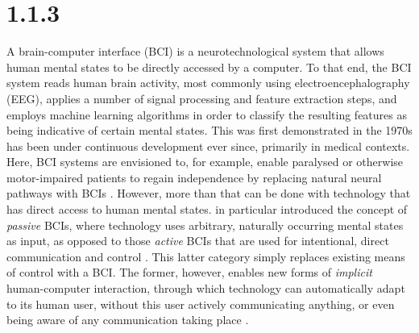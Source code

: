 \documentclass[a4paper]{article}
\begin{document}
\title{}
\date{}

\author[1,*]{Laurens R. Krol}
\author[2]{Thorsten O. Zander}


\maketitle

\begin{abstract}

\end{abstract}


\section*{1.1.3}

A brain-computer interface (BCI) is a neurotechnological system that allows human mental states to be directly accessed by a computer. To that end, the BCI system reads human brain activity, most commonly using electroencephalography (EEG), applies a number of signal processing and feature extraction steps, and employs machine learning algorithms in order to classify the resulting features as being indicative of certain mental states. This was first demonstrated in the 1970s \cite{vidal1977realtimedetect} has been under continuous development ever since, primarily in medical contexts. Here, BCI systems are envisioned to, for example, enable paralysed or otherwise motor-impaired patients to regain independence by replacing natural neural pathways with BCIs \cite{wolpaw2002commcontrol}. However, more than that can be done with technology that has direct access to human mental states.  in particular introduced the concept of \emph{passive} BCIs, where technology uses arbitrary, naturally occurring mental states as input, as opposed to those \emph{active} BCIs that are used for intentional, direct communication and control \cite{krol2018interactivity}. This latter category simply replaces existing means of control with a BCI. The former, however, enables new forms of \emph{implicit} human-computer interaction, through which technology can automatically adapt to its human user, without this user actively communicating anything, or even being aware of any communication taking place \cite{krol2022definingnat}.
\end{document}

